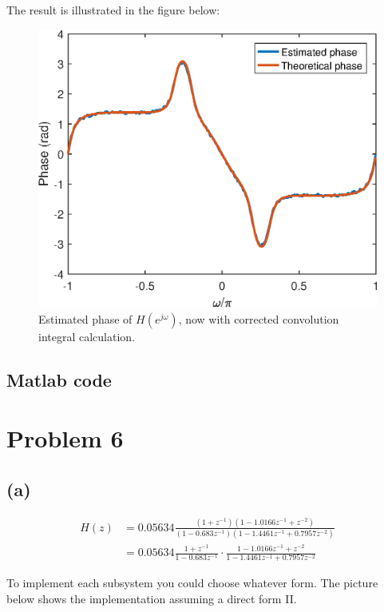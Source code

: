 \documentclass{article}
\begin{document}
The result is illustrated in the figure below:
\FloatBarrier
\begin{figure}[h!]
	\centering
	\includegraphics[scale=0.7]{figs/hw04_q3d_phase_correct.eps}
	\caption{Estimated phase of $H(e^{j\omega})$, now with corrected convolution integral calculation.}
\end{figure}
\FloatBarrier

\subsection{Matlab code}



\section{Problem 6}

\subsection{(a)}

\begin{align} \nonumber
H(z) &= 0.05634\frac{(1+z^{-1})(1 -1.0166z^{-1} + z^{-2})}{(1-0.683z^{-1})(1 -1.4461z^{-1} + 0.7957z^{-2})} \\
&= 0.05634\frac{1+z^{-1}}{1-0.683z^{-1}}\cdot\frac{1 -1.0166z^{-1} + z^{-2}}{1 -1.4461z^{-1} + 0.7957z^{-2}}
\end{align}

To implement each subsystem you could choose whatever form. The picture below shows the implementation assuming a direct form II.
\end{document}
